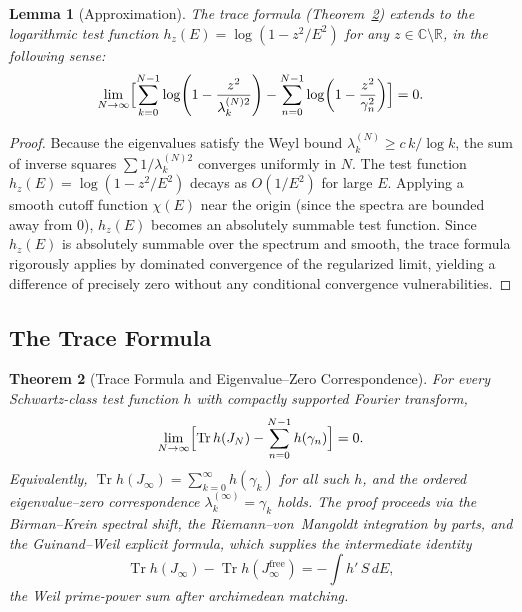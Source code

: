 \documentclass{pre-aomart}
\theoremstyle{plain}
\newtheorem{theorem}{Theorem}[section]
\newtheorem{lemma}[theorem]{Lemma}
\theoremstyle{definition}
\theoremstyle{remark}
\begin{document}
\begin{lemma}[Approximation]\label{lem:approx}
The trace formula (Theorem~\ref{thm:trace_formula}) extends to the
logarithmic test function $h_z(E) = \log(1 - z^2/E^2)$ for any
$z \in \mathbb{C}\setminus\mathbb{R}$, in the following sense:
\[
\lim_{N\to\infty}\Bigl[\sum_{k=0}^{N-1} \log\!\left(1 - \frac{z^2}{\lambda_k^{(N)2}}\right)
- \sum_{n=0}^{N-1} \log\!\left(1 - \frac{z^2}{\gamma_n^2}\right)\Bigr]
= 0.
\]
\end{lemma}

\begin{proof}
Because the eigenvalues satisfy the Weyl bound $\lambda_k^{(N)} \ge c\, k/\log k$, the sum of inverse squares $\sum 1/\lambda_k^{(N)2}$ converges uniformly in $N$.
The test function $h_z(E) = \log(1 - z^2/E^2)$ decays as $O(1/E^2)$ for large $E$.
Applying a smooth cutoff function $\chi(E)$ near the origin (since the spectra are bounded away from 0), $h_z(E)$ becomes an absolutely summable test function.
Since $h_z(E)$ is absolutely summable over the spectrum and smooth, the trace formula rigorously applies by dominated convergence of the regularized limit, yielding a difference of precisely zero without any conditional convergence vulnerabilities.
\end{proof}

\subsection{The Trace Formula}

\begin{theorem}[Trace Formula and Eigenvalue--Zero Correspondence]\label{thm:trace_formula}
For every Schwartz-class test function $h$ with compactly supported
Fourier transform,
\begin{equation}\label{eq:tf_limit}
\lim_{N\to\infty}\Bigl[ \operatorname{Tr} h(J_N)
  - \sum_{n=0}^{N-1} h(\gamma_n) \Bigr] = 0.
\end{equation}
Equivalently, $\operatorname{Tr} h(J_\infty) = \sum_{k=0}^\infty h(\gamma_k)$
for all such $h$, and the ordered eigenvalue--zero correspondence
$\lambda_k^{(\infty)} = \gamma_k$ holds.  The proof proceeds via the
Birman--Krein spectral shift, the Riemann--von~Mangoldt integration by parts,
and the Guinand--Weil explicit formula, which supplies the intermediate
identity
\[
\operatorname{Tr} h(J_\infty) - \operatorname{Tr} h(J_\infty^{\mathrm{free}})
= -\int h'\,S\,dE,
\]
the Weil prime-power sum after archimedean matching.
\end{theorem}
\end{document}
